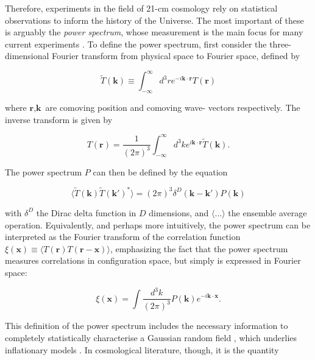 \documentclass[floats,floatfix,showpacs,amssymb,prd,superscriptaddress,nofootinbib, 11pt]{revtex4-2} %
\begin{document}
Therefore, experiments in the field of 21-cm cosmology rely on statistical observations to inform the history of the Universe. The most important of these is arguably the \textit{power spectrum}, whose measurement is the main focus for many current experiments \citep{DeBoer_2017}. To define the power spectrum, first consider the three-dimensional Fourier transform from physical space to Fourier space, defined by

\begin{equation}
    \tilde{T} (\textbf{k}) \equiv \int^\infty _{-\infty} d^3 r e^{-i\textbf{k} \cdot \textbf{r}} T(\textbf{r})
\end{equation}

\noindent where $\textbf{r}, \textbf{k}$ are comoving position and comoving wave- vectors respectively. The inverse transform is given by 

\begin{equation}
    T(\textbf{r}) = \frac{1}{(2 \pi)^3} \int^\infty _{-\infty} d^3 k e^{i \textbf{k} \cdot \textbf{r}} \tilde{T}(\textbf{k}).
\end{equation}

The power spectrum $P$ can then be defined by the equation

\begin{equation}
    \langle \tilde{T} (\textbf{k}) \tilde{T} (\textbf{k}') ^{*} \rangle = (2 \pi)^3 \delta^{D}  (\textbf{k} - \textbf{k}') P(\textbf{k})
\end{equation}

\noindent with $\delta^D$ the Dirac delta function in $D$ dimensions, and $\langle ... \rangle$ the ensemble average operation. Equivalently, and perhaps more intuitively, the power spectrum can be interpreted as the Fourier transform of the correlation function $\xi(\textbf{x}) \equiv \langle T(\textbf{r}) T(\textbf{r} - \textbf{x}) \rangle$, emphasizing the fact that the power spectrum measures correlations in configuration space, but simply is expressed in Fourier space:

\begin{equation}
    \xi(\textbf{x}) = \int \frac{d^3 k}{(2 \pi)^3} P(\textbf{k}) e^{-i \textbf{k} \cdot \textbf{x}}.
\end{equation}

This definition of the power spectrum includes the necessary information to completely statistically characterise a Gaussian random field \citep{Coles_2001}, which underlies inflationary models \citep{Guth_Pi_1982, Brandenberger_1985}. In cosmological literature, though, it is the quantity 
\end{document}
